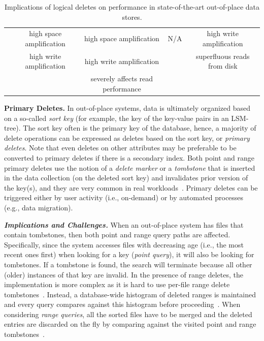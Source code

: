 \documentclass[11pt,dvipdfmx]{article}
\newcommand\Paragraph[1]{\vspace{0.02in}  \noindent \textbf{#1.}}
\newcommand\Paragraphbit[1]{\vspace{0.02in}  \noindent \textbf{\textit{#1.}}}
\begin{document}
\begin{table}[h]
{\begin{tabular}{c|cc|cc}
        \\  & high space amplification 
            & high space amplification
            & N/A
            & high write amplification
        \\  & high write amplification
            & high write amplification
            & 
            & superfluous reads from disk
        \\  & 
            & severely affects read performance 
            & 
            & \\
        \bottomrule
        \end{tabular}
   }
   \vspace{-0.1in}
    \caption{Implications of logical deletes on performance in state-of-the-art out-of-place data stores.} \label{tab:summary}
    \vspace{-0.1in}
\end{table}

\Paragraph{Primary Deletes} In out-of-place systems, data is ultimately organized based on a so-called
\emph{sort key} (for example, the key of the key-value pairs in an LSM-tree). The
sort key often is the primary key of the database, hence, a majority of delete 
operations can be expressed as deletes based on the sort key, or \emph{primary
deletes}. Note that even deletes on other attributes may be preferable to be
converted to primary deletes if there is a secondary index. Both point and range
primary deletes use the notion of a \emph{delete marker} or a \emph{tombstone}
that is inserted in the data collection (on the deleted sort key) and invalidates 
prior version of the key(s), and they are very common in real workloads~\cite{Cao2020}. 
Primary deletes can be triggered either by user activity (i.e., on-demand) or by automated processes (e.g., data migration). 

\Paragraphbit{Implications and Challenges} When an out-of-place system has files that contain
tombstones, then both point and range query paths are affected. Specifically, since the system
accesses files with decreasing age (i.e., the most recent ones first) when 
looking for a key (\emph{point query}), it will also be looking for tombstones. If a 
tombstone is found,
the search will terminate because all other (older) instances of that key are 
invalid. 
In the presence of range deletes, the implementation is more complex as it is hard
to use per-file range delete tombstones~\cite{Madan2018}. Instead, a database-wide histogram
of deleted ranges is maintained and every query compares against this histogram before 
proceeding~\cite{Sarkar2020}.
When considering \emph{range queries}, all the sorted files have to be merged 
and the deleted entries are discarded on the fly by comparing against the
visited point and range tombstones~\cite{Callaghan2020}. 
\end{document}
